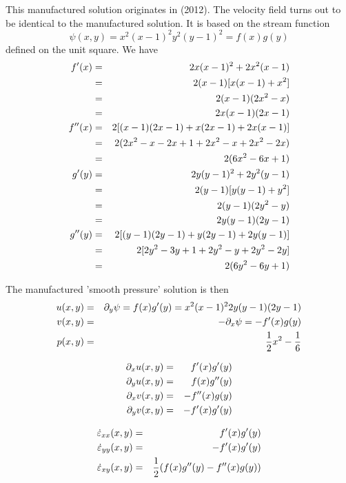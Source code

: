 This manufactured solution originates in \textcite{bocg12} (2012).
The velocity field turns out to be identical to the \textcite{dohu03} manufactured solution.
It is based on the stream function 
\[
\psi (x,y)=x^2(x-1)^2y^2(y-1)^2 =f(x)g(y)
\]
defined on the unit square. We have 
\begin{eqnarray}
f'(x)
&=&2x(x-1)^2+2x^2(x-1) \nonumber\\
&=&2(x-1)[x(x-1)+x^2]  \nonumber\\
&=&2(x-1)(2x^2 -x)  \nonumber\\
&=&2x(x-1)(2x -1)  \nonumber\\
f''(x)
&=& 2 [ (x-1)(2x -1) + x(2x-1)+2x(x-1)] \nonumber\\
&=& 2 (2x^2 -x-2x+1 + 2x^2-x+2x^2-2x) \nonumber\\
&=& 2 (6x^2 -6x +1) \nonumber\\
g'(y)
&=& 2y (y-1)^2 + 2y^2(y-1)  \nonumber\\
&=& 2(y-1)[y(y-1)+y^2] \nonumber\\
&=& 2(y-1)(2y^2-y) \nonumber\\
&=& 2y(y-1)(2y-1) \nonumber\\
g''(y) 
&=& 2[ (y-1)(2y-1) +y(2y-1)+2y(y-1) ] \nonumber\\
&=& 2[ 2y^2 - 3y +1 +2y^2-y +2y^2-2y] \nonumber\\
&=& 2(6y^2 -6y+1)
\end{eqnarray}

The manufactured 'smooth pressure' solution is then
\begin{eqnarray}
u(x,y) &=& \partial_y \psi = f(x)g'(y) = x^2(x-1)^2 2y(y-1)(2y-1) \nonumber\\
v(x,y) &=& -\partial_x \psi = -f'(x)g(y) \nonumber\\
p(x,y) &=& \frac12 x^2 -\frac16 \nonumber
\end{eqnarray}

\begin{eqnarray}
\partial_x u (x,y)&=& f'(x)g'(y)\nonumber\\
\partial_y u (x,y)&=& f(x)g''(y)\nonumber\\
\partial_x v (x,y)&=& -f''(x)g(y)\nonumber\\
\partial_y v (x,y)&=& -f'(x)g'(y)\nonumber
\end{eqnarray}

\begin{eqnarray}
\dot\varepsilon_{xx}(x,y) &=& f'(x)g'(y) \nonumber\\
\dot\varepsilon_{yy}(x,y) &=&  -f'(x)g'(y) \nonumber\\
\dot\varepsilon_{xy}(x,y) &=& \frac12(f(x)g''(y)-f''(x)g(y)) \nonumber
\end{eqnarray}

